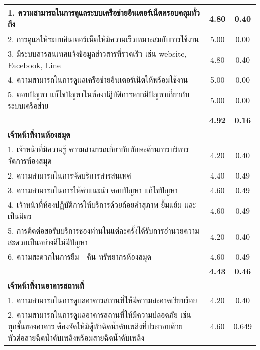 \begin{longtable}{|>{\raggedright}p{11cm}|c|c|}
	1. ความสามารถในการดูแลระบบเครือข่ายอินเตอร์เน็ตครอบคลุมทั่วถึง     			& 4.80            & 0.40          \\ \hline
	2. การดูแลให้ระบบอินเตอร์เน็ตให้มีความเร็วเหมาะสมกับการใช้งาน         		& 5.00             & 0.00          \\ \hline
	3. มีระบบสารสนเทศแจ้งข้อมูลข่าวสารที่รวดเร็ว เช่น website, Facebook, Line    & 4.80     & 0.40          \\ \hline
	4. ความสามารถในการดูแลเครือข่ายอินเตอร์เน็ตให้พร้อมใช้งาน                 & 5.00            & 0.00          \\ \hline
	5. ตอบปัญหา แก้ไขปัญหาในห้องปฏิบัติการหากมีปัญหาเกี่ยวกับระบบเครือข่าย       	& 5.00           & 0.00          \\ \hline
	\multicolumn{1}{|r|}{\textbf{เฉลี่ยเจ้าหน้าที่เทคโนโลยีสารสนเทศ}}  & \textbf{4.92}  & \textbf{0.16} \\ \hline
	\textbf{เจ้าหน้าที่งานห้องสมุด}         					&                  &               \\ \hline
	1. เจ้าหน้าที่มีความรู้ ความสามารถเกี่ยวกับทักษะด้านการบริหารจัดการห้องสมุด    		& 4.20           & 0.40          \\ \hline
	2. ความสามารถในการจัดบริการสารสนเทศ  						& 4.40             & 0.49          \\ \hline
	3. ความสามารถในการให้คำแนะนำ ตอบปัญหา แก้ไขปัญหา				& 4.60             & 0.49          \\ \hline
	4. เจ้าหน้าที่ห้องปฏิบัติการให้บริการด้วยถ้อยคำสุภาพ ยิ้มแย้ม และเป็นมิตร  			& 4.60          & 0.49          \\ \hline
	5. การติดต่อขอรับบริการชองท่านในแต่ละครั้งได้รับการอำนวยความสะดวกเป็นอย่างดีไม่มีปัญหา & 4.20           & 0.40          \\ \hline
	6. ความสะดวกในการยืม - คืน ทรัพยากรห้องสมุด & 4.60       & 0.49          \\ \hline
	\multicolumn{1}{|r|}{\textbf{เฉลี่ยเจ้าหน้าที่ห้องสมุด}} & \textbf{4.43}     & \textbf{0.46} \\ \hline	\textbf{เจ้าหน้าที่งานอาคารสถานที่}         &                                   &               \\ \hline
		1. ความสามารถในการดูแลอาคารสถานที่ให้มีความสะอาดเรียบร้อย                            
		& 4.20                              & 0.40          \\ \hline
				2. ความสามารถในการดูแลอาคารสถานที่ให้มีความปลอดภัย เช่น ทุกชั้นของอาคาร 
			ต้องจัดให้มีตู้หัวฉีดน้ำดับเพลิงที่ประกอบด้วย หัวต่อสายฉีดน้ำดับเพลิงพร้อมสายฉีดน้ำดับเพลิง  & 4.60                              & 0.649          \\ \hline

\end{longtable}
